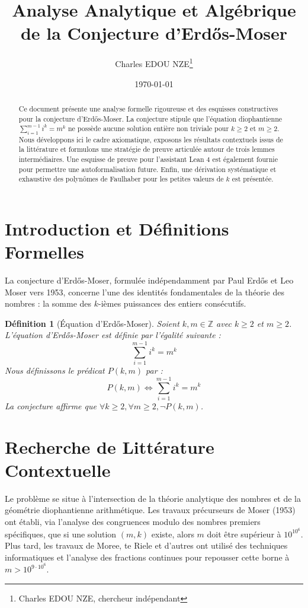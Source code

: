 \documentclass[11pt,a4paper]{article}
\title{Analyse Analytique et Algébrique de la Conjecture d'Erd\H{o}s-Moser}
\author{Charles EDOU NZE\thanks{Charles EDOU NZE, chercheur indépendant}}
\date{\today}
\newtheorem{definition}{Définition}
\begin{document}
\maketitle

\begin{abstract}
Ce document présente une analyse formelle rigoureuse et des esquisses constructives pour la conjecture d'Erd\H{o}s-Moser. La conjecture stipule que l'équation diophantienne $\sum_{i=1}^{m-1} i^k = m^k$ ne possède aucune solution entière non triviale pour $k \geq 2$ et $m \geq 2$. Nous développons ici le cadre axiomatique, exposons les résultats contextuels issus de la littérature et formulons une stratégie de preuve articulée autour de trois lemmes intermédiaires. Une esquisse de preuve pour l'assistant Lean 4 est également fournie pour permettre une autoformalisation future. Enfin, une dérivation systématique et exhaustive des polynômes de Faulhaber pour les petites valeurs de $k$ est présentée.
\end{abstract}

\section{Introduction et Définitions Formelles}

La conjecture d'Erd\H{o}s-Moser, formulée indépendamment par Paul Erd\H{o}s et Leo Moser vers 1953, concerne l'une des identités fondamentales de la théorie des nombres : la somme des $k$-ièmes puissances des entiers consécutifs.

\begin{definition}[Équation d'Erd\H{o}s-Moser]
Soient $k, m \in \mathbb{Z}$ avec $k \geq 2$ et $m \geq 2$. L'équation d'Erd\H{o}s-Moser est définie par l'égalité suivante :
\begin{equation}
\sum_{i=1}^{m-1} i^k = m^k
\label{eq:erdosmoser}
\end{equation}
Nous définissons le prédicat $P(k, m)$ par :
$$ P(k, m) \iff \sum_{i=1}^{m-1} i^k = m^k $$
La conjecture affirme que $\forall k \geq 2, \forall m \geq 2, \neg P(k, m)$.
\end{definition}

\section{Recherche de Littérature Contextuelle}

Le problème se situe à l'intersection de la théorie analytique des nombres et de la géométrie diophantienne arithmétique. Les travaux précurseurs de Moser (1953) ont établi, via l'analyse des congruences modulo des nombres premiers spécifiques, que si une solution $(m,k)$ existe, alors $m$ doit être supérieur à $10^{10^6}$. Plus tard, les travaux de Moree, te Riele et d'autres ont utilisé des techniques informatiques et l'analyse des fractions continues pour repousser cette borne à $m > 10^{9 \cdot 10^6}$.
\end{document}
